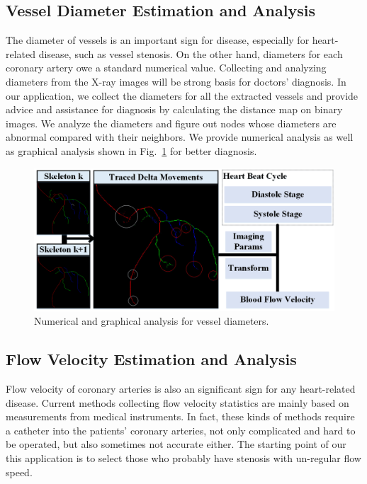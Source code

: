 \documentclass[journal]{IEEEtran}
\begin{document}
\label{sec:application}
\subsection{Vessel Diameter Estimation and Analysis}
The diameter of vessels is an important sign for disease, especially for heart-related disease, such as vessel stenosis. On the other hand, diameters for each coronary artery owe a standard numerical value. Collecting and analyzing diameters from the X-ray images will be strong basis for doctors' diagnosis. In our application, we collect the diameters for all the extracted vessels and provide advice and assistance for diagnosis by calculating the distance map on binary images. We analyze the diameters and figure out nodes whose diameters are abnormal compared with their neighbors. We provide numerical analysis as well as graphical analysis shown in Fig.~\ref{fig:app_diameter_analysis} for better diagnosis.

\begin{figure}[!t]
\centering
\includegraphics[width=1.0\linewidth]{./images/application-pipeline.png}
\caption{Numerical and graphical analysis for vessel diameters.}
\label{fig:app_diameter_analysis}
\end{figure}

\subsection{Flow Velocity Estimation and Analysis}
Flow velocity of coronary arteries is also an significant sign for any heart-related disease. Current methods collecting flow velocity statistics are mainly based on measurements from medical instruments. In fact, these kinds of methods require a catheter into the patients' coronary arteries, not only complicated and hard to be operated, but also sometimes not accurate either. The starting point of our this application is to select those who probably have stenosis with un-regular flow speed.
\end{document}
